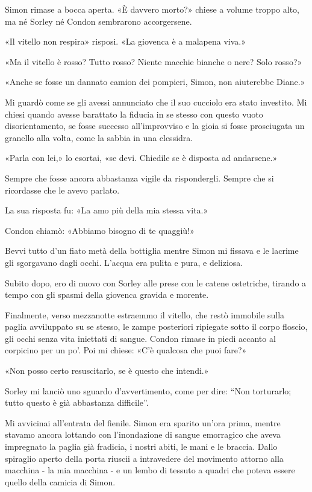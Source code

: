 Simon rimase a bocca aperta. «È davvero morto?» chiese a volume troppo
alto, ma né Sorley né Condon sembrarono accorgersene.

«Il vitello non respira» risposi. «La giovenca è a malapena viva.»

«Ma il vitello è rosso? Tutto rosso? Niente macchie bianche o nere? Solo
rosso?»

«Anche se fosse un dannato camion dei pompieri, Simon, non aiuterebbe
Diane.»

Mi guardò come se gli avessi annunciato che il suo cucciolo era stato
investito. Mi chiesi quando avesse barattato la fiducia in se stesso con
questo vuoto disorientamento, se fosse successo all'improvviso e la
gioia si fosse prosciugata un granello alla volta, come la sabbia in una
clessidra.

«Parla con lei,» lo esortai, «se devi. Chiedile se è disposta ad
andarsene.»

Sempre che fosse ancora abbastanza vigile da rispondergli. Sempre che si
ricordasse che le avevo parlato.

La sua risposta fu: «La amo più della mia stessa vita.»

Condon chiamò: «Abbiamo bisogno di te quaggiù!»

Bevvi tutto d'un fiato metà della bottiglia mentre Simon mi fissava e le
lacrime gli sgorgavano dagli occhi. L'acqua era pulita e pura, e
deliziosa.

Subito dopo, ero di nuovo con Sorley alle prese con le catene
ostetriche, tirando a tempo con gli spasmi della giovenca gravida e
morente.

\separatorefiori

Finalmente, verso mezzanotte estraemmo il vitello, che restò immobile
sulla paglia avviluppato su se stesso, le zampe posteriori ripiegate
sotto il corpo floscio, gli occhi senza vita iniettati di sangue. Condon
rimase in piedi accanto al corpicino per un po'. Poi mi chiese: «C'è
qualcosa che puoi fare?»

«Non posso certo resuscitarlo, se è questo che intendi.»

Sorley mi lanciò uno sguardo d'avvertimento, come per dire: ``Non
torturarlo; tutto questo è già abbastanza difficile''.

Mi avvicinai all'entrata del fienile. Simon era sparito un'ora prima,
mentre stavamo ancora lottando con l'inondazione di sangue emorragico
che aveva impregnato la paglia già fradicia, i nostri abiti, le mani e
le braccia. Dallo spiraglio aperto della porta riuscii a intravedere del
movimento attorno alla macchina - la mia macchina - e un lembo di
tessuto a quadri che poteva essere quello della camicia di Simon.

